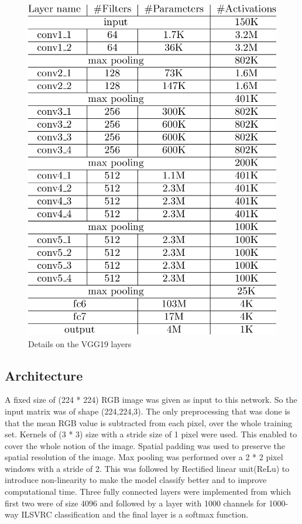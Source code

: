 \begin{figure}[H]
	\label{ss}
	\centering
	\includegraphics[width=20cm,height=15cm,keepaspectratio]{vgg19-arch-details.png}
	\caption{Details on the VGG19 layers}
\end{figure}

\subsection{Architecture}
A fixed size of (224 * 224) RGB image was given as input to this network. So the input matrix was of shape (224,224,3).
The only preprocessing that was done is that the mean RGB value is subtracted from each pixel, over the whole training set.
Kernels of (3 * 3) size with a stride size of 1 pixel were used. This enabled to cover the whole notion of the image.
Spatial padding was used to preserve the spatial resolution of the image.
Max pooling was performed over a 2 * 2 pixel windows with a stride of 2.
This was followed by Rectified linear unit(ReLu) to introduce non-linearity to make the model classify better and to improve computational time.
Three fully connected layers were implemented from which first two were of size 4096 and followed by a layer with 1000 channels for 1000-way ILSVRC classification and the final layer is a softmax function.

